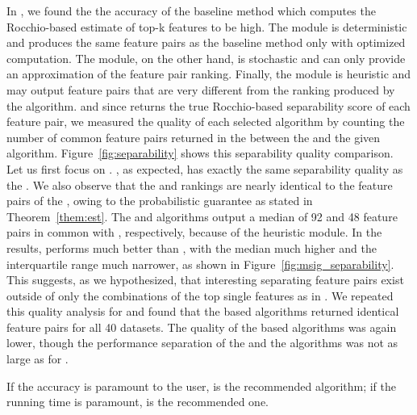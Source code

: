  In \bruterocchioratio, we found the the accuracy of the baseline method which computes the Rocchio-based estimate of top-k features to be high. The \earlyT module is deterministic and produces the same \topk feature pairs as the baseline method only with optimized computation. The \sampling module, on the other hand, is stochastic and can only provide an approximation of the \topk feature pair ranking. Finally, the \traversal module is heuristic and may output \topk feature pairs that are very different from the ranking produced by the \baseline algorithm.
and since \baseline returns the true Rocchio-based separability score of each feature pair, we measured the quality of each selected algorithm by counting the number of common feature pairs returned in the \tophundred between the \baseline and the given algorithm. Figure~\ref{fig:separability} shows this separability quality comparison. Let us first focus on \msig. \earlyOrder, as expected, has exactly the same separability quality as the \baseline. We also observe that the \samp and \sampOpt rankings are nearly identical to the \tophundred feature pairs of the \baseline, owing to the probabilistic guarantee as stated in Theorem~\ref{them:est}. The \horiz and \vertic algorithms output a median of 92 and 48 feature pairs in common with \baseline, respectively, because of the heuristic \traversal module. In the \msig results, \horiz performs much better than \vertic, with the median much higher and the interquartile range much narrower, as shown in Figure~\ref{fig:msig_separability}. This suggests, as we hypothesized, that interesting separating feature pairs exist outside of only the combinations of the top single features as in \vertic. We repeated this quality analysis for \lincs and found that the \sampling based algorithms returned identical \tophundred feature pairs for all 40 datasets. The quality of the \traversal based algorithms was again lower, though the performance separation of the \horiz and the \vertic algorithms was not as large as for \msig.

 If the accuracy is paramount to the user,
\sampOpt is the recommended algorithm; if the running time is paramount, \horiz is the recommended one.


